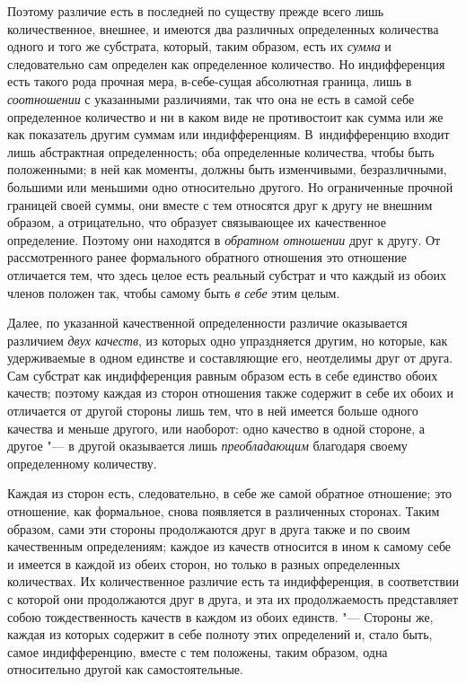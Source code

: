 Поэтому различие есть в последней по существу прежде всего лишь количественное,
внешнее, и имеются два различных определенных количества одного и того же
субстрата, который, таким образом, есть их {\em сумма} и следовательно сам
определен как определенное количество. Но индифференция есть такого рода
прочная мера, в-себе-сущая абсолютная граница, лишь в {\em соотношении} с
указанными различиями, так что она не есть в самой себе определенное количество
и ни в каком виде не противостоит как сумма или же как показатель другим суммам
или индифференциям. В~индифференцию входит лишь абстрактная определенность; оба
определенные количества, чтобы быть положенными; в ней как моменты, должны быть
изменчивыми, безразличными, большими или меньшими одно относительно другого. Но
ограниченные прочной границей своей суммы, они вместе с тем относятся друг к
другу не внешним образом, а отрицательно, что образует связывающее их
качественное определение. Поэтому они находятся в {\em обратном отношении} друг
к другу. От рассмотренного ранее формального обратного отношения это отношение
отличается тем, что здесь целое есть реальный субстрат и что каждый из обоих
членов положен так, чтобы самому быть {\em в себе} этим целым.

Далее, по указанной качественной определенности различие оказывается различием
{\em двух качеств}, из которых одно упраздняется другим, но которые, как
удерживаемые в одном единстве и составляющие его, неотделимы друг от друга. Сам
субстрат как индифференция равным образом есть в себе единство обоих качеств;
поэтому каждая из сторон отношения также содержит в себе их обоих и отличается
от другой стороны лишь тем, что в ней имеется больше одного качества и меньше
другого, или наоборот: одно качество в одной стороне, а другое "--- в другой
оказывается лишь {\em преобладающим} благодаря своему определенному количеству.

Каждая из сторон есть, следовательно, в себе же самой обратное отношение; это
отношение, как формальное, снова появляется в различенных сторонах. Таким
образом, сами эти стороны продолжаются друг в друга также и по своим
качественным определениям; каждое из качеств относится в ином к самому себе и
имеется в каждой из обеих сторон, но только в разных определенных количествах.
Их количественное различие есть та индифференция, в соответствии с которой они
продолжаются друг в друга, и эта их продолжаемость представляет собою
тождественность качеств в каждом из обоих единств. "--- Стороны же, каждая из
которых содержит в себе полноту этих определений и, стало быть, самое
индифференцию, вместе с тем положены, таким образом, одна относительно другой
как самостоятельные.

